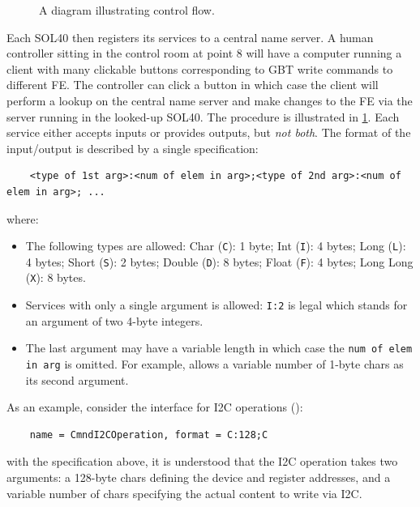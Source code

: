 \begin{figure}[!htb]
    \centering
    \hspace{0.2em}
    \resizebox{0.75\columnwidth}{!}{
        
    }
    \hspace{0.2em}
    \caption{
        A diagram illustrating \dim control flow.
    }
    \label{fig:dim-lhcb}
\end{figure}

Each SOL40 then registers its \dim services to a central name server.
A human controller sitting in the control room at point 8 will have a computer
running a \dim client with many clickable buttons corresponding to GBT write
commands to different FE.
The controller can click a button in which case the \dim client will perform
a lookup on the central name server and make changes to the FE via the
\dim server running in the looked-up SOL40.
The procedure is illustrated in \cref{fig:dim-lhcb}.
Each \dim service either accepts inputs or provides outputs,
but \emph{not both}.
The format of the input/output is described by a single specification:

\begin{lstlisting}
    <type of 1st arg>:<num of elem in arg>;<type of 2nd arg>:<num of elem in arg>; ...
\end{lstlisting}
where:

\begin{itemize}
    \item The following types are allowed:
        Char (\lstinline{C}): 1 byte;
        Int (\lstinline{I}): 4 bytes;
        Long (\lstinline{L}): 4 bytes;
        Short (\lstinline{S}): 2 bytes;
        Double (\lstinline{D}): 8 bytes;
        Float (\lstinline{F}): 4 bytes;
        Long Long (\lstinline{X}): 8 bytes.
    \item Services with only a single argument is allowed:
        \lstinline{I:2} is legal which stands for an argument of  two 4-byte
        integers.
    \item The last argument may have a variable length in which case
        the \lstinline{num of elem in arg} is omitted.
        For example,  allows a variable number of 1-byte chars
        as its second argument.
\end{itemize}

As an example,
consider the interface for I2C operations ():
\begin{lstlisting}
    name = CmndI2COperation, format = C:128;C
\end{lstlisting}
with the specification above,
it is understood that the I2C operation takes two arguments:
a 128-byte chars defining the device and register addresses,
and a variable number of chars specifying the actual content to write via I2C.


